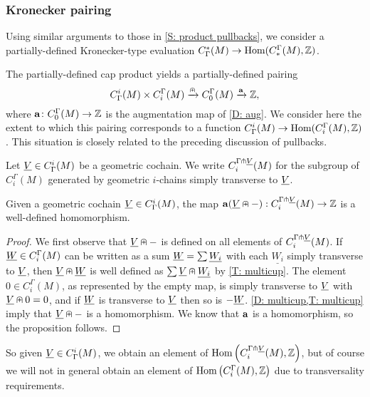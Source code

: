 \subsubsection{Kronecker pairing}\label{S: Kronecker}
Using similar arguments to those in \cref{S: product pullbacks}, we consider a partially-defined Kronecker-type evaluation $C^*_\Gamma(M) \to \textup{Hom}(C_*^\Gamma(M),\mathbb{Z})$.

The partially-defined cap product yields a partially-defined pairing
$$C^i_\Gamma(M) \times C_i^\Gamma(M) \xrightarrow{\nplus} C_0^\Gamma(M) \xrightarrow{\mathbf{a}}\mathbb{Z},$$
where $\mathbf{a} \colon C_0^\Gamma(M) \to \mathbb{Z}$ is the augmentation map of \cref{D: aug}.
We consider here the extent to which this pairing corresponds to a function $C^i_\Gamma(M) \to \textup{Hom}(C_i^\Gamma(M),\mathbb{Z})$.
This situation is closely related to the preceding discussion of pullbacks.

\begin{definition}\label{D: transverse to cohain}
	Let $\underline{V} \in C^i_\Gamma(M)$ be a geometric cochain.
	We write $C_i^{\Gamma \pitchfork \underline{V}}(M)$ for the subgroup of $C_i^\Gamma(M)$ generated by geometric $i$-chains simply transverse to $\underline{V}$.
\end{definition}

\begin{proposition}
	Given a geometric cochain $\underline{V} \in C^i_\Gamma(M)$, the map $\mathbf{a}(\underline{V}\nplus -):C_i^{\Gamma \pitchfork \underline{V}}(M) \to \mathbb{Z}$ is a well-defined homomorphism.
\end{proposition}

\begin{proof}
	We first observe that $\underline{V}\nplus -$ is defined on all elements of $C_i^{\Gamma \pitchfork \underline{V}}(M)$.
	If $\underline{W} \in C_i^\Gamma(M)$ can be written as a sum $\underline{W} = \sum \underline{W_i}$ with each $\underline{W_i}$ simply transverse to $\underline{V}$, then $\underline{V}\nplus \underline{W}$ is well defined as $\sum \underline{V}\nplus \underline{W_i}$ by \cref{T: multicup}.
	The element $0 \in C_i^\Gamma(M)$, as represented by the empty map, is simply transverse to $\underline{V}$ with $\underline{V}\nplus 0 = 0$, and if $\underline{W}$ is transverse to $\underline{V}$ then so is $-\underline{W}$.
	\cref{D: multicup,T: multicup} imply that $\underline{V} \nplus -$ is a homomorphism.
	We know that $\mathbf{a}$ is a homomorphism, so the proposition follows.
\end{proof}

So given $\underline{V} \in C^i_\Gamma(M)$, we obtain an element of $\textup{Hom}\left(C_i^{\Gamma \pitchfork \underline{V}}(M),\mathbb{Z}\right)$, but of course we will not in general obtain an element of $\textup{Hom}\left(C_i^{\Gamma}(M), \mathbb{Z} \right)$ due to transversality requirements.

